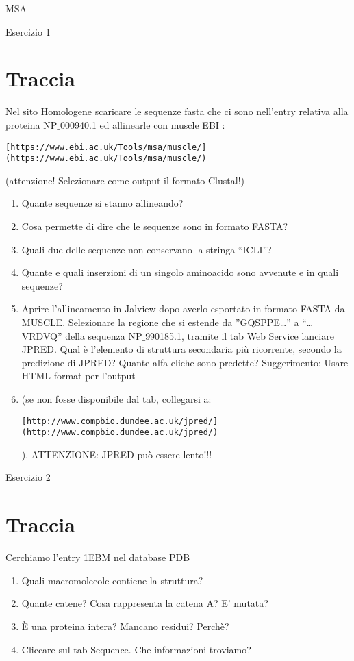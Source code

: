 \documentclass{article}
\begin{document}
\begin{center}
   \Huge
   MSA
\end{center}
\begin{center}
   \huge
   Esercizio 1
\end{center}
\section*{Traccia}
Nel sito Homologene scaricare le sequenze fasta che ci sono nell'entry relativa alla proteina NP$\_$000940.1 ed allinearle con muscle EBI : \begin{verbatim}[https://www.ebi.ac.uk/Tools/msa/muscle/](https://www.ebi.ac.uk/Tools/msa/muscle/)\end{verbatim} (attenzione! Selezionare come output il formato Clustal!)
\begin{enumerate}
   \item Quante sequenze si stanno allineando?
   \item Cosa permette di dire che le sequenze sono in formato FASTA?
   \item Quali due delle sequenze non conservano la stringa “ICLI”?
   \item Quante e quali inserzioni di un singolo aminoacido sono avvenute e in quali sequenze?
   \item Aprire l'allineamento in Jalview dopo averlo esportato in formato FASTA da MUSCLE. Selezionare la regione che si estende da ”GQSPPE…” a “… VRDVQ” della sequenza NP$\_$990185.1, tramite il tab Web Service lanciare JPRED. Qual è l'elemento di struttura secondaria più ricorrente, secondo la predizione di JPRED? Quante alfa eliche sono predette? Suggerimento: Usare HTML format per l'output
   \item (se non fosse disponibile dal tab, collegarsi a: \begin{verbatim}[http://www.compbio.dundee.ac.uk/jpred/](http://www.compbio.dundee.ac.uk/jpred/)\end{verbatim} ). ATTENZIONE: JPRED può essere lento!!!
\end{enumerate}

\begin{center}
   \huge
   Esercizio 2
\end{center}
\section*{Traccia}
Cerchiamo l'entry 1EBM nel database PDB
\begin{enumerate}
   \item Quali macromolecole contiene la struttura?
   \item Quante catene? Cosa rappresenta la catena A? E' mutata?
   \item È una proteina intera? Mancano residui? Perchè?
   \item Cliccare sul tab Sequence. Che informazioni troviamo?
\end{enumerate}
\end{document}
